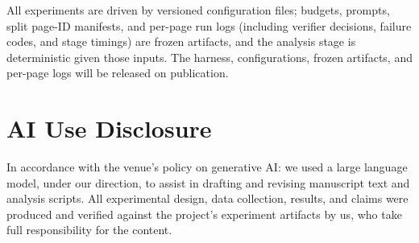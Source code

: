 \documentclass[conference]{IEEEtran}
\begin{document}
All experiments are driven by versioned configuration files; budgets,
prompts, split page-ID manifests, and per-page run logs (including
verifier decisions, failure codes, and stage timings) are frozen
artifacts, and the analysis stage is deterministic given those inputs.
The harness, configurations, frozen artifacts, and per-page logs will be
released on publication.

\section*{AI Use Disclosure}

In accordance with the venue's policy on generative AI: we used a large
language model, under our direction, to assist in drafting and revising
manuscript text and analysis scripts. All experimental design, data
collection, results, and claims were produced and verified against the
project's experiment artifacts by us, who take full
responsibility for the content.



\end{document}
